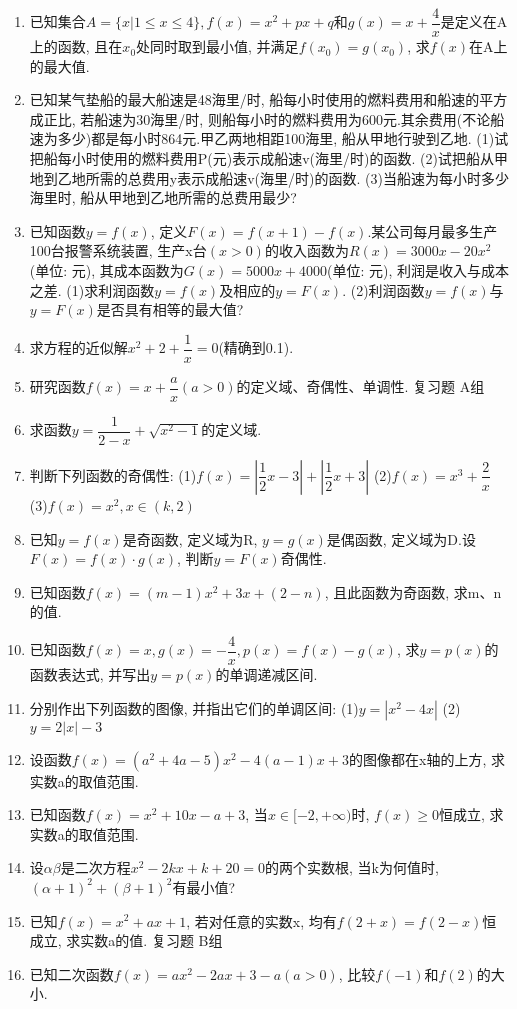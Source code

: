 \documentclass[10pt,a4paper]{article}
\begin{document}
\begin{enumerate}[1.]
\item 已知集合$A=\{x|1\le x\le 4\},f(x)=x^2+px+q$和$g(x)=x+\dfrac 4x$是定义在A上的函数, 且在$x_0$处同时取到最小值, 并满足$f(x_0)=g(x_0)$, 求$f(x)$在A上的最大值.
\item 已知某气垫船的最大船速是48海里/时, 船每小时使用的燃料费用和船速的平方成正比, 若船速为30海里/时, 则船每小时的燃料费用为600元.其余费用(不论船速为多少)都是每小时864元.甲乙两地相距100海里, 船从甲地行驶到乙地.
(1)试把船每小时使用的燃料费用P(元)表示成船速v(海里/时)的函数.
(2)试把船从甲地到乙地所需的总费用y表示成船速v(海里/时)的函数.
(3)当船速为每小时多少海里时, 船从甲地到乙地所需的总费用最少?
\item 已知函数$y=f(x)$, 定义$F(x)=f(x+1)-f(x)$.某公司每月最多生产 100台报警系统装置, 生产x台$(x>0)$的收入函数为$R(x)=3000x-20x^2$(单位: 元), 其成本函数为$G(x)=5000x+4000$(单位: 元), 利润是收入与成本之差.
(1)求利润函数$y=f(x)$及相应的$y=F(x)$.
(2)利润函数$y=f(x)$与$y=F(x)$是否具有相等的最大值?
\item 求方程的近似解$x^2+2+\dfrac 1x=0$(精确到0.1).
\item 研究函数$f(x)=x+\dfrac ax(a>0)$的定义域、奇偶性、单调性.
复习题
A组
\item 求函数$y=\dfrac 1{2-x}+\sqrt {x^2-1}$的定义域.
\item 判断下列函数的奇偶性:
(1)$f(x)=|\dfrac 12x-3|+|\dfrac 12x+3|$				(2)$f(x)=x^3+\dfrac 2x$
(3)$f(x)=x^2,x\in (k,2)$
\item 已知$y=f(x)$是奇函数, 定义域为R, $y=g(x)$是偶函数, 定义域为D.设$F(x)=f(x)\cdot g(x)$, 判断$y=F(x)$奇偶性.
\item 已知函数$f(x)=(m-1)x^2+3x+(2-n)$, 且此函数为奇函数, 求m、n的值.
\item 已知函数$f(x)=x,g(x)=-\dfrac 4x,p(x)=f(x)-g(x)$, 求$y=p(x)$的函数表达式, 并写出$y=p(x)$的单调递减区间.
\item 分别作出下列函数的图像, 并指出它们的单调区间:
(1)$y=|x^2-4x|$							(2)$y=2|x|-3$
\item 设函数$f(x)=(a^2+4a-5)x^2-4(a-1)x+3$的图像都在x轴的上方, 求实数a的取值范围.
\item 已知函数$f(x)=x^2+10x-a+3$, 当$x\in [-2,+\infty)$时, $f(x)\ge 0$恒成立, 求实数a的取值范围.
\item 设$\alpha \beta$是二次方程$x^2-2kx+k+20=0$的两个实数根, 当k为何值时, $(\alpha +1)^2+(\beta +1)^2$有最小值?
\item 已知$f(x)=x^2+ax+1$, 若对任意的实数x, 均有$f(2+x)=f(2-x)$恒成立, 求实数a的值.
复习题
B组
\item 已知二次函数$f(x)=ax^2-2ax+3-a(a>0)$, 比较$f(-1)$和$f(2)$的大小.

\end{enumerate}
\end{document}
